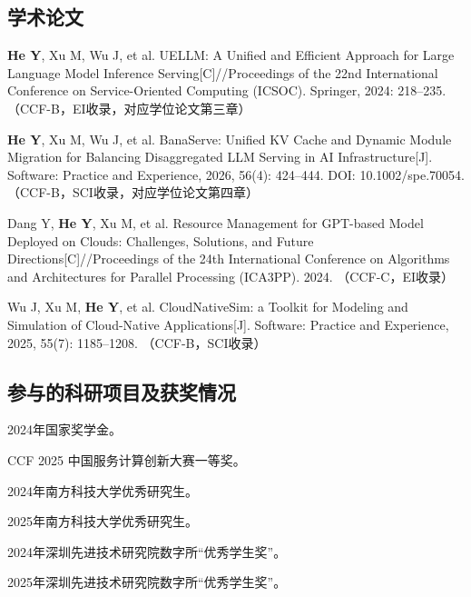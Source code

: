 \begin{resume}
  \subsection*{学术论文}

  \begin{achievements}
    \item \textbf{He Y}, Xu M, Wu J, et al. UELLM: A Unified and Efficient Approach for
    Large Language Model Inference Serving[C]//Proceedings of the 22nd
    International Conference on Service-Oriented Computing (ICSOC).
    Springer, 2024: 218--235.
    （CCF-B，EI收录，对应学位论文第三章）

    \item \textbf{He Y}, Xu M, Wu J, et al. BanaServe: Unified KV Cache and Dynamic
    Module Migration for Balancing Disaggregated LLM Serving in AI
    Infrastructure[J]. Software: Practice and Experience, 2026, 56(4):
    424--444. DOI: 10.1002/spe.70054.
    （CCF-B，SCI收录，对应学位论文第四章）

    \item Dang Y, \textbf{He Y}, Xu M, et al. Resource Management for GPT-based
    Model Deployed on Clouds: Challenges, Solutions, and Future
    Directions[C]//Proceedings of the 24th International Conference on
    Algorithms and Architectures for Parallel Processing (ICA3PP).
    2024. （CCF-C，EI收录）

    \item Wu J, Xu M, \textbf{He Y}, et al. CloudNativeSim: a Toolkit for Modeling and Simulation of Cloud-Native Applications[J]. Software: Practice
    and Experience, 2025, 55(7): 1185--1208. （CCF-B，SCI收录）

\end{achievements}



  
  \subsection*{参与的科研项目及获奖情况}
  \begin{achievements}
    \item 2024年国家奖学金。
    \item CCF 2025 中国服务计算创新大赛一等奖。
    \item 2024年南方科技大学优秀研究生。
    \item 2025年南方科技大学优秀研究生。
    \item 2024年深圳先进技术研究院数字所“优秀学生奖”。
    \item 2025年深圳先进技术研究院数字所“优秀学生奖”。
  \end{achievements}

\end{resume}
